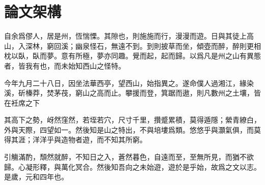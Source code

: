 \section{論文架構}

自余爲僇人，居是州，恆惴慄。其隙也，則施施而行，漫漫而遊。日與其徒上高山，入深林，窮回溪；幽泉怪石，無遠不到。到則披草而坐，傾壺而醉，醉則更相枕以臥，臥而夢。意有所極，夢亦同趣。覺而起，起而歸。以爲凡是州之山有異態者，皆我有也，而未始知西山之怪特。

今年九月二十八日，因坐法華西亭，望西山，始指異之。遂命僕人過湘江，緣染溪，斫榛莽，焚茅茷，窮山之高而止。攀援而登，箕踞而遨，則凡數州之土壤，皆在衽席之下

其高下之勢，岈然窪然，若垤若穴，尺寸千里，攢蹙累積，莫得遁隱；縈青繚白，外與天際，四望如一。然後知是山之特出，不與培塿爲類。悠悠乎與灝氣俱，而莫得其涯；洋洋乎與造物者遊，而不知其所窮。

引觴滿酌，頹然就醉，不知日之入，蒼然暮色，自遠而至，至無所見，而猶不欲歸。心凝形釋，與萬化冥合。然後知吾向之未始遊，遊於是乎始，故爲之文以志。是歲，元和四年也。